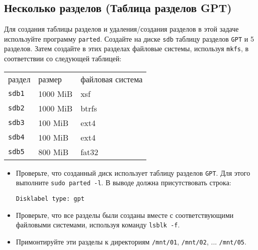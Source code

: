 \documentclass{article}
\begin{document}
\subsection{Несколько разделов (Таблица разделов GPT)}
Для создания таблицы разделов и удаления/создания разделов в этой задаче используйте программу \texttt{parted}. Создайте на диске \texttt{sdb} таблицу разделов \texttt{GPT} и 5 разделов. Затем создайте в этих разделах файловые системы, используя \texttt{mkfs}, в соответствии со следующей таблицей:
\begin{center}
\begin{tabular}{lll}
 раздел & размер  	& файловая система   \\
 \texttt{sdb1} 	& 1000 MiB 		& xsf   \\
 \texttt{sdb2} 	& 1000 MiB 		& btrfs \\
 \texttt{sdb3} 	& 100 MiB 		& ext4 \\
 \texttt{sdb4} 	& 100 MiB 		& ext4 \\
 \texttt{sdb5} 	& 800 MiB 		& fat32 \\
\end{tabular}
\end{center}

\begin{itemize}
\item Проверьте, что созданный диск использует таблицу разделов \texttt{GPT}. Для этого выполните \texttt{sudo parted -l}. В выводе должна присутствовать строка:
\begin{lstlisting}
Disklabel type: gpt
\end{lstlisting}
\item Проверьте, что все разделы были созданы вместе с соответствующими файловыми системами, используя команду \texttt{lsblk -f}.
\item Примонтируйте эти разделы к директориям \texttt{/mnt/01}, \texttt{/mnt/02}, ... \texttt{/mnt/05}.
\end{itemize}
\end{document}
